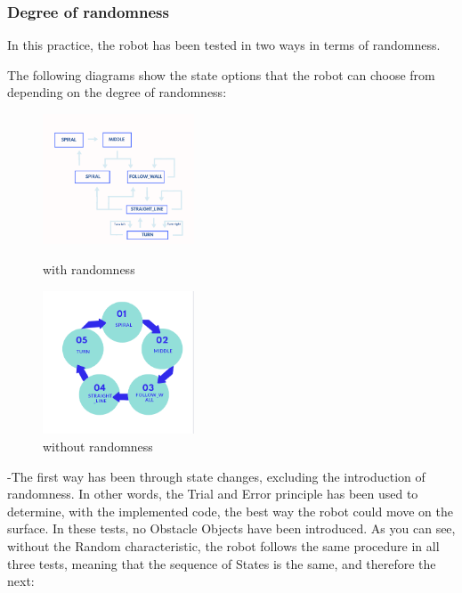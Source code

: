 \documentclass[conference]{IEEEtran}
\begin{document}
\subsubsection{Degree of randomness}
In this practice, the robot has been tested in two ways in terms of randomness.

The following diagrams show the state options that the robot can choose from depending on the degree of randomness:

\begin{figure}
  \centering
  \includegraphics[width=0.4\textwidth]{DiagramaCon.png}
  \caption{with randomness}
  \label{fig:with randomness}

  \vspace{1.0 cm}
  
  \centering
  \includegraphics[width=0.4\textwidth]{DiagramaSin.png}
  \caption{without randomness}
  \label{fig:without randomness}

  
\end{figure}

  \vspace{10.0 cm}

-The first way has been through state changes, excluding the introduction of randomness. In other words, the Trial and Error principle has been used to determine, with the implemented code, the best way the robot could move on the surface. In these tests, no Obstacle Objects have been introduced. As you can see, without the Random characteristic, the robot follows the same procedure in all three tests, meaning that the sequence of States is the same, and therefore the next:
\end{document}
